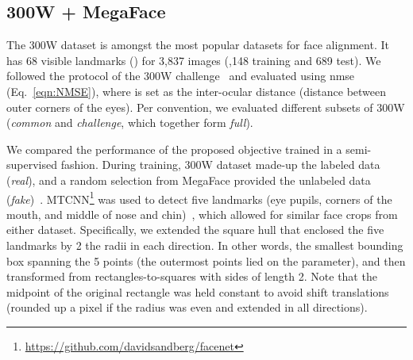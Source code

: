 \documentclass[10pt,twocolumn,letterpaper]{article}
\begin{document}
\subsection{300W + MegaFace}
The 300W dataset is amongst the most popular datasets for face alignment. It has 68 visible landmarks (\ie ) for 3,837 images (,148 training and 689 test). We followed the protocol of the 300W challenge~\cite{sagonas2013300} and evaluated using \gls{nmse} (Eq.~\ref{eqn:NMSE}), where  is set as the inter-ocular distance (\ie distance between outer corners of the eyes). Per convention, we evaluated different subsets of 300W (\ie \textit{common} and \textit{challenge}, which together form \textit{full}).

We compared the performance of the proposed objective trained in a semi-supervised fashion. During training, 300W dataset made-up the labeled data (\ie \textit{real}), and a random selection from MegaFace provided the unlabeled data (\ie \textit{fake})~\cite{nech2017level}. MTCNN\footnote{\url{https://github.com/davidsandberg/facenet}} was used to detect five landmarks (\ie eye pupils, corners of the mouth, and middle of nose and chin)~\cite{zhang2016joint}, which allowed for similar face crops from either dataset. Specifically, we extended the square hull that enclosed the five landmarks by 2 the radii in each direction. In other words, the smallest bounding box spanning the 5 points (\ie the outermost points lied on the parameter), and then transformed from rectangles-to-squares with sides of length 2. Note that the midpoint of the original rectangle was held constant to avoid shift translations (\ie rounded up a pixel if the radius was even and extended in all directions).
\end{document}
